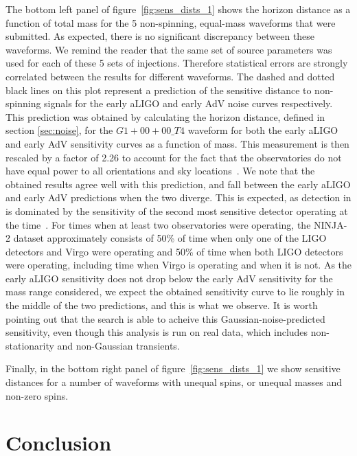 The bottom left panel of figure~\ref{fig:sens_dists_1} shows the
horizon distance as a function of total mass for the 5 non-spinning,
equal-mass waveforms that were submitted. As expected, there is no
significant discrepancy between these waveforms. We remind the reader that the 
same set of source parameters was used for each of these 5 sets of injections. 
Therefore statistical errors are strongly correlated between the results for
different waveforms. The dashed and dotted black lines on this plot represent 
a prediction of the sensitive distance to non-spinning signals for the 
early aLIGO and early AdV noise curves respectively. This prediction was 
obtained by calculating the horizon distance, defined in section 
\ref{sec:noise}, for the $G1+00+00\_T4$ waveform for both the early aLIGO and 
early AdV sensitivity curves as a function of mass. This measurement is then 
rescaled by a factor of 2.26 to account for the fact that the observatories do 
not have equal power to all orientations and sky locations~\cite{Finn:1992xs}. 
We note that the obtained results agree well with this prediction, and fall 
between the early aLIGO and early AdV predictions when the two diverge. This 
is expected, as detection in \ihope{} is dominated by the sensitivity of the 
second most sensitive detector operating at the time~\cite{Babak:2012zx}. For 
times when at least two observatories were operating, the NINJA-2 dataset 
approximately consists of 50\% of time when only one of the LIGO detectors and 
Virgo were operating and 50\% of time when both 
LIGO detectors were operating, including time when Virgo is operating and when 
it is not. As the early aLIGO sensitivity does not drop below the early AdV 
sensitivity for the mass range considered, we expect the obtained sensitivity 
curve to lie roughly in the middle of the two predictions, and this is what we 
observe. It is worth pointing out that the \ihope{} search is able to acheive 
this Gaussian-noise-predicted sensitivity, even though this analysis is run on 
real data, which includes non-stationarity and non-Gaussian transients.

Finally, in the bottom right panel of figure~\ref{fig:sens_dists_1} we show 
sensitive distances for a number of waveforms with unequal spins, or unequal 
masses and non-zero spins.

\section{Conclusion}
\label{sec:conclusions}

